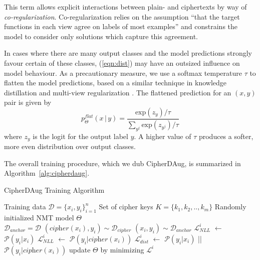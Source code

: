 \documentclass[11pt]{article}
\begin{document}
This term allows explicit interactions between plain- and ciphertexts by way of \textit{co-regularization}. Co-regularization relies on the assumption ``that the target functions in each view agree on labels of most examples'' \cite{sindhwani2005co} and constrains the model to consider only solutions which capture this agreement.


In cases where there are many output classes and the model predictions strongly favour certain of these classes, (\ref{eqn:dist}) may have an outsized influence on model behaviour. As a precautionary measure, we use a softmax temperature $\tau$ to flatten the model predictions, based on a similar technique in knowledge distillation \cite{hinton2015distilling} and multi-view regularization \cite{wang-etal-2021-multi-view}. The flattened prediction for an $(x,y)$ pair is given by \begin{equation}
    p_{\Theta}^{flat}(x\,|\,y) = \frac{\text{exp}(z_y)/\tau} {\sum_{y^j}\text{exp}(z_{y^j})/\tau}
\end{equation}
where $z_y$ is the logit for the output label $y$. A higher value of $\tau$ produces a softer, more even distribution over output classes.




The overall training procedure, which we dub CipherDAug, is summarized in Algorithm~\ref{alg:cipherdaug}.

\begin{algorithm}
\small
\caption{CipherDAug Training Algorithm}\label{alg:cipherdaug}
\begin{algorithmic}
\State Training data $\mathcal{D} = \{x_i,y_i\}_{i=1}^{n}$
\State Set of cipher keys $K = \{k_1, k_2, .. , k_m\}$ 
\State Randomly initialized NMT model $\Theta$ \\


\State $\mathcal{D}_{anchor} = \mathcal{D} $  
 
\State $ ( \textit{cipher}(x_i), y_i ) \sim \mathcal{D}_{cipher} $
\State $ ( x_i, y_i ) \sim \mathcal{D}_{anchor} $  
\State {}
\State $\mathcal{L}_{NLL}^i$ $\gets$ $\mathcal{P}(y_i | x_i)$ \State $\mathcal{L}_{NLL}^i$ $\gets$ $\mathcal{P}(y_i | \textit{cipher}(x_i))$ \State $\mathcal{L}_{dist}^i$ $\gets$ $\mathcal{P}(y_i | x_i)$ || $\mathcal{P}(y_i | \textit{cipher}(x_i))$
\State {}
\State update $\Theta$ by minimizing $\mathcal{L}^i$  
\EndFor
\EndWhile

\EndProcedure

\end{algorithmic}
\end{algorithm}
\end{document}
